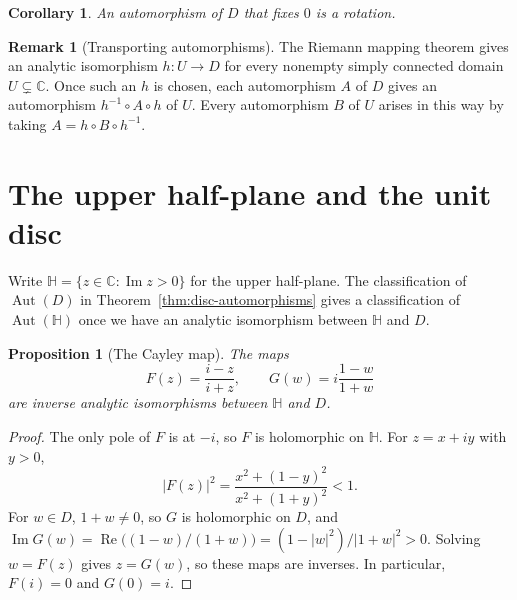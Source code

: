 \documentclass[11pt]{article}
\theoremstyle{plain}
\newtheorem{proposition}[theorem]{Proposition}
\newtheorem{corollary}[theorem]{Corollary}
\theoremstyle{definition}
\theoremstyle{boldremark}
\newtheorem*{remark}{Remark}
\theoremstyle{remark}
\numberwithin{equation}{section}
\newcommand{\C}{\mathbb{C}}
\DeclareMathOperator{\Real}{Re}
\DeclareMathOperator{\Imag}{Im}
\newenvironment{lecturefigure}
 {\par\addvspace{0.25em}\begingroup\setlength{\parskip}{0pt}\centering}
 {\par\endgroup\addvspace{0.25em}}
\begin{document}
\begin{corollary}\label{cor:disc-rotation}
An automorphism of $D$ that fixes $0$ is a rotation.
\end{corollary}

\newpage
\begin{remark}[Transporting automorphisms]
The Riemann mapping theorem gives an analytic isomorphism $h:U\to D$
for every nonempty simply connected domain $U\subsetneq\C$. Once such
an $h$ is chosen, each automorphism $A$ of $D$ gives an automorphism
$h^{-1}\circ A\circ h$ of $U$. Every automorphism $B$ of $U$ arises
in this way by taking $A=h\circ B\circ h^{-1}$.
\begin{lecturefigure}
\end{lecturefigure}
\end{remark}

\section{The upper half-plane and the unit disc}

Write $\mathbb H=\{z\in\C:\Imag z>0\}$ for the upper half-plane.
The classification of $\operatorname{Aut}(D)$ in
Theorem~\ref{thm:disc-automorphisms} gives a classification of
$\operatorname{Aut}(\mathbb H)$ once we have an analytic isomorphism
between $\mathbb H$ and $D$.

\begin{proposition}[The Cayley map]\label{prop:cayley}
The maps
\begin{equation}
 F(z)=\frac{i-z}{i+z},\qquad G(w)=i\frac{1-w}{1+w}
\end{equation}
are inverse analytic isomorphisms between $\mathbb H$ and $D$.
\end{proposition}
\begin{proof}
The only pole of $F$ is at $-i$, so $F$ is holomorphic on $\mathbb H$.
For $z=x+iy$ with $y>0$,
\begin{equation}
 |F(z)|^2=\frac{x^2+(1-y)^2}{x^2+(1+y)^2}<1.
\end{equation}
For $w\in D$, $1+w\ne0$, so $G$ is holomorphic on $D$, and
$\Imag G(w)=\Real\bigl((1-w)/(1+w)\bigr)=(1-|w|^2)/|1+w|^2>0$.
Solving $w=F(z)$ gives $z=G(w)$, so these maps are inverses.
In particular, $F(i)=0$ and $G(0)=i$.
\end{proof}
\end{document}

